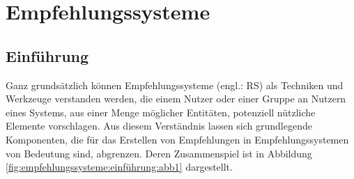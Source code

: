 
\chapter{Empfehlungssysteme}
\label{ch:empfehlungssysteme}

\section{Einführung}
\label{ch:empfehlungssysteme:einführung}
Ganz grundsätzlich können Empfehlungssysteme (engl.: \ac{RS}) als Techniken und Werkzeuge \cite[S. 4]{ricci:inbook}\cite[S. 1]{yadav:inproceedings} verstanden werden, die einem Nutzer oder einer Gruppe an Nutzern eines Systems, aus einer Menge möglicher Entitäten, potenziell nützliche Elemente vorschlagen.
Aus diesem Verständnis lassen sich grundlegende Komponenten, die für das Erstellen von Empfehlungen in Empfehlungssystemen von Bedeutung sind, abgrenzen.
Deren Zusammenspiel ist in Abbildung \ref{fig:empfehlungssysteme:einführung:abb1} dargestellt.

